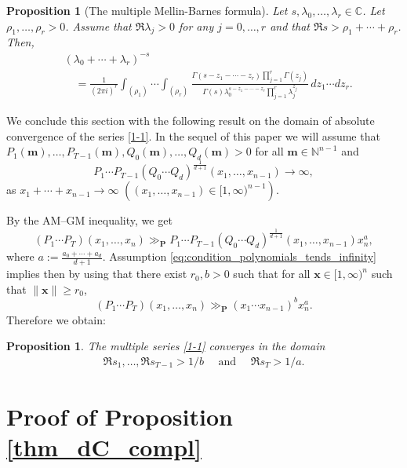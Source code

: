 \documentclass[a4paper,12pt]{article}
\newtheorem{prop}[thm]{Proposition}
\theoremstyle{definition}
\numberwithin{equation}{section}
\def\N{{\mathbb N}}
\def\C{{\mathbb C}}
\newcommand{\dd}{d}
\newcommand{\ii}{i}
\begin{document}
\begin{prop}
[The multiple Mellin-Barnes formula]
\label{MMB_formula}
Let $s,\lambda_0,\ldots, \lambda_r \in \C$. Let $\rho_1, \ldots, \rho_r >0$. Assume that 
$\Re \lambda_j>0$ for any $j=0,\ldots, r$ and that $\Re s>\rho_1+\cdots+\rho_r$. Then, 
\begin{align*}
&\left(\lambda_0+\cdots +\lambda_r\right)^{-s}\\
&\quad=
\frac{1}{(2\pi \ii)^r} \int_{(\rho_1)} \cdots \int_{(\rho_r)}
\frac{\Gamma (s-z_1-\cdots-z_r) \prod_{j=1}^r\Gamma (z_j)}
{\Gamma (s)\lambda_0^{s-z_1-\cdots -z_r} \prod_{j=1}^r\lambda_j^{z_j}}
\, \dd z_1 \cdots \dd z_r.
\end{align*}
\end{prop}

We conclude this section with the following result on the domain of absolute convergence of the series \eqref{1-1}.
In the sequel of this paper we will assume that 
$P_1(\mathbf{m}),\ldots, P_{T-1}(\mathbf{m}), Q_0(\mathbf{m}),\ldots, Q_d(\mathbf{m}) >0$ for all $\mathbf{m} \in \N^{n-1}$ and 
\begin{equation}\label{eq:condition_polynomials_tends_infinity}
P_1 \cdots P_{T-1}
\left(Q_0 \cdots Q_d\right)^{\frac{1}{d+1}}(x_1,\ldots, x_{n-1}) \to \infty, 
\end{equation}
as $x_1+\cdots+x_{n-1} \to \infty$ $\left((x_1,\ldots, x_{n-1}) \in [1, \infty)^{n-1}\right)$.

By the AM–GM inequality, we get
$$(P_1\cdots P_T) (x_1,\ldots ,x_n) \gg_{\mathbf{P}} P_1\cdots P_{T-1} (Q_0\cdots Q_d)^{\frac{1}{d+1}} (x_1,\ldots,x_{n-1}) x_n^a, $$
where $a:=\frac{a_0+\cdots+a_d}{d+1}$.
Assumption \eqref{eq:condition_polynomials_tends_infinity} implies then by using \cite[Lemma 1]{Esso97} that there exist $r_0, b >0$ such that for all $\mathbf{x}\in [1,\infty)^n$ such that $\lVert \mathbf{x} \rVert \geq r_0$,
$$(P_1\cdots P_{T})(x_1,\ldots,x_n) \gg_{\mathbf{P}} (x_1\cdots x_{n-1})^b x_n^a. $$
Therefore we obtain:
\begin{prop}\label{conv_domain}
The multiple series \eqref{1-1} converges in the domain 
\begin{align}\label{1-2}
\Re s_1,\ldots,\Re s_{T-1}> 1/b \quad \text{ and } \quad \Re s_T> 1/a.
\end{align}
\end{prop}

\section{Proof of Proposition \ref{thm_dC_compl}}
\label{Comp_dC}
\end{document}
